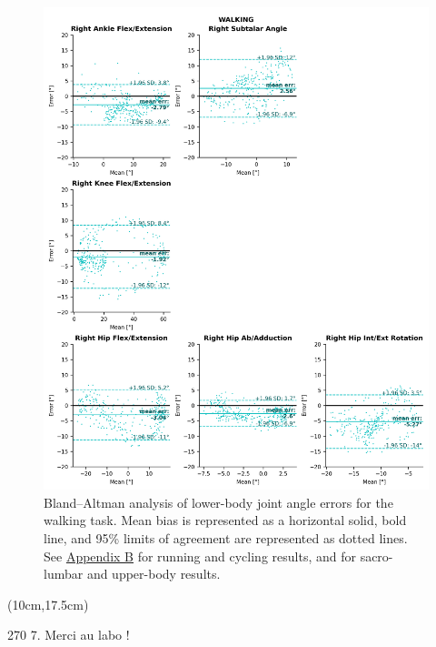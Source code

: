 \begin{figure}[!ht]
	\centering
	\def\svgwidth{1\columnwidth}
	\fontsize{10pt}{10pt}\selectfont
	\includegraphics[width=0.97\linewidth]{"../Chap5/Figures/Fig_BlandWalk.png"}
	\caption{Bland–Altman analysis of lower-body joint angle errors for the walking task. Mean bias is represented as a horizontal solid, bold line, and 95\% limits of agreement are represented as dotted lines. See \hyperref[Ann:2]{Appendix B} for running and cycling results, and for sacro-lumbar and upper-body results.}
	\label{fig_blandwalk}
\end{figure}


\begin{textblock*}{10cm}(10cm,17.5cm) %
      \begin{turn}{270} 
            \scriptsize \emojiegg
            \tiny \textcolor{BleuCyan}{7. Merci au labo !} 
            \scriptsize \emojitube
      \end{turn}
    \end{textblock*}



